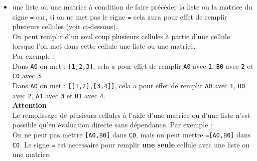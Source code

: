 \documentclass[a4paper,11pt]{book}
\begin{document}
\begin{itemize}
le nom de la cellule {\tt A2} apparait\`a la suite du contenu pr\'ec\'edent 
({\tt 3+}).\\
Donc quand on \'edite le contenu d'une case, si on clique dans le tableur
alors, le nom ou la plage des noms selectionn\'es, s'affichent dans la
ligne de commande.\\
{\bf Exemple}\\
On veut remplir la case {\tt A1} avec la formule {\tt 1+A2} :\\
- on efface la ligne de commande,\\
- on clique sur {\tt A1},\\
- on clique sur la ligne de commande et on tape {\tt =1+},\\
- on clique sur la cellule {\tt A0} puis, {\tt Enter}.\\
Cela marque {\tt 1+A0} dans la cellule {\tt A1}. \\
Pour annuler une modification en  mode \'edition, il n'est donc pas possible de
 simplement cliquer sur une autre cellule du tableur puisque cela recopierait 
le nom de cette autre cellule.
En ligne de commande, c'est la touche {\tt Esc} qui annule l'\'edition.
\item  une liste ou une matrice \`a condition de faire pr\'ec\'eder la liste ou la matrice du signe {\tt =} car, si on ne met pas le signe {\tt =} cela aura pour effet de remplir plusieurs cellules (voir ci-dessous).\\
On peut remplir d'un seul coup plusieurs cellules \`a partie d'une cellule
lorsque l'on met dans cette cellule une liste ou une matrice.\\
Par exemple :\\
Dans {\tt A0} on met : {\tt [1,2,3]}, cela a pour effet de remplir 
{\tt A0} avec {\tt 1}, {\tt B0} avec {\tt 2} et {\tt C0} avec {\tt 3}.\\
Dans {\tt A0} on met : {\tt [[1,2],[3,4]]}, cela a pour effet de
 remplir {\tt A0} avec {\tt 1}, {\tt B0} avec {\tt 2}, {\tt A1} avec {\tt 3} 
et {\tt B1} avec {\tt 4}.\\
{\bf Attention} \\
Le remplissage de plusieurs cellules \`a l'aide d'une matrice ou d'une liste 
n'est possible qu'en \'evaluation directe sans d\'ependance.
Par exemple :\\
On ne peut pas mettre {\tt [A0,B0]} dans {\tt C0}, mais on peut mettre 
{\tt  =[A0,B0]} dans {\tt C0}.
Le signe {\tt =} est necessaire pour remplir {\bf une seule} cellule avec
 une liste ou une matrice.\\

\end{itemize}
\end{document}
